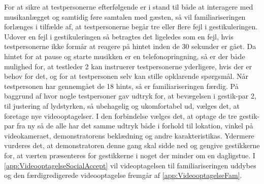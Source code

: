 For at sikre at testpersonerne efterfølgende er i stand til både at interagere med musikanlægget og samtidig føre samtalen med gæsten, så vil familiariseringen forlænges i tilfælde af, at testpersonerne begår tre eller flere fejl i gestikuleringen. Udover en fejl i gestikuleringen så betragtes det ligeledes som en fejl, hvis testpersonerne ikke formår at reagere på hintet inden de 30 sekunder er gået. Da hintet for at pause og starte musikken er en telefonopringning, så er der både mulighed for, at testleder 2 kan instruerer testpersonerne yderligere, hvis der er behov for det, og for at testpersonen selv kan stille opklarende spørgsmål. Når testpersonen har gennemgået de 18 hints, så er familiariseringen færdig.\blankline
%
På baggrund af  hvor nogle testpersoner gav udtryk for, at bevægelsen i gestik-par 2, til justering af lydstyrken, så ubehagelig og ukomfortabel ud, vælges det, at foretage nye videooptagelser. I den forbindelse vælges det, at optage de tre gestik-par fra ny så de alle har det samme udtryk både i forhold til lokation, vinkel på videokameraet, demonstratorens beklædning og andre karakteristikas. Ydermere vurderes det, at demonstratoren denne gang skal sidde ned og gengive gestikkerne for, at værten præsenteres for gestikkerne i noget der minder om en dagligstue. I \autoref{app:VideooptagelseSocialAccept} vil videoptagelsen til familiariseringen uddybes og den færdigredigerede videooptagelse fremgår af \autoref{app:VideooptagelseFam}.

